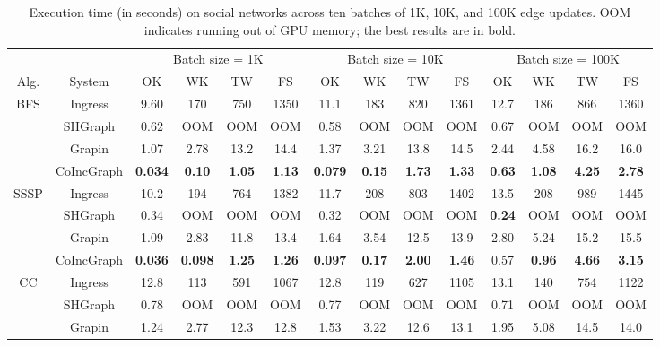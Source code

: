 \begin{table}[t]
\centering
\footnotesize
\setlength{\tabcolsep}{6pt}
\caption{Execution time (in seconds) on social networks across ten batches of 1K, 10K, and 100K edge updates. OOM indicates running out of GPU memory; the best results are in bold.}
\label{tab:overall}
\begin{tabular*}{0.859\textwidth}{c|c|cccc|cccc|cccc}
\hline
 & & \multicolumn{4}{c|}{Batch size = 1K} & \multicolumn{4}{c|}{Batch size = 10K} & \multicolumn{4}{c}{Batch size = 100K} \\
Alg. & System & OK & WK & TW & FS & OK & WK & TW & FS & OK & WK & TW & FS \\
\hline
\multirow{4}{*}{BFS}
& Ingress    & 9.60 & 170 & 750 & 1350 & 11.1 & 183 & 820 & 1361 & 12.7 & 186 & 866 & 1360 \\
& SHGraph    & 0.62 & OOM & OOM & OOM & 0.58 & OOM & OOM & OOM & 0.67 & OOM & OOM & OOM \\
& Grapin     & 1.07 & 2.78 & 13.2 & 14.4 & 1.37 & 3.21 & 13.8 & 14.5 & 2.44 & 4.58 & 16.2 & 16.0 \\
& CoIncGraph & \textbf{0.034} & \textbf{0.10} & \textbf{1.05} & \textbf{1.13} & \textbf{0.079} & \textbf{0.15} & \textbf{1.73} & \textbf{1.33} & \textbf{0.63} & \textbf{1.08} & \textbf{4.25} & \textbf{2.78} \\
\hline
\multirow{4}{*}{SSSP}
& Ingress    & 10.2 & 194 & 764 & 1382 & 11.7 & 208 & 803 & 1402 & 13.5 & 208 & 989 & 1445 \\
& SHGraph    & 0.34 & OOM & OOM & OOM & 0.32 & OOM & OOM & OOM & \textbf{0.24} & OOM & OOM & OOM \\
& Grapin     & 1.09 & 2.83 & 11.8 & 13.4 & 1.64 & 3.54 & 12.5 & 13.9 & 2.80 & 5.24 & 15.2 & 15.5 \\
& CoIncGraph & \textbf{0.036} & \textbf{0.098} & \textbf{1.25} & \textbf{1.26} & \textbf{0.097} & \textbf{0.17} & \textbf{2.00} & \textbf{1.46} & 0.57 & \textbf{0.96} & \textbf{4.66} & \textbf{3.15} \\
\hline
\multirow{4}{*}{CC}
& Ingress    & 12.8 & 113 & 591 & 1067 & 12.8 & 119 & 627 & 1105 & 13.1 & 140 & 754 & 1122 \\
& SHGraph    & 0.78 & OOM & OOM & OOM & 0.77 & OOM & OOM & OOM & 0.71 & OOM & OOM & OOM \\
& Grapin     & 1.24 & 2.77 & 12.3 & 12.8 & 1.53 & 3.22 & 12.6 & 13.1 & 1.95 & 5.08 & 14.5 & 14.0 \\

\end{tabular*}
\end{table}
